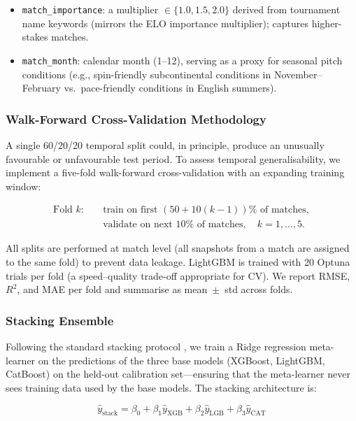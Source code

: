 \documentclass[12pt,a4paper,oneside]{report}
\begin{document}
\begin{itemize}[nosep]
    \item \texttt{match\_importance}: a multiplier $\in \{1.0, 1.5, 2.0\}$ derived from tournament name keywords (mirrors the ELO importance multiplier); captures higher-stakes matches.
    \item \texttt{match\_month}: calendar month (1--12), serving as a proxy for seasonal pitch conditions (e.g., spin-friendly subcontinental conditions in November--February vs.\ pace-friendly conditions in English summers).
\end{itemize}

\subsubsection*{Walk-Forward Cross-Validation Methodology}
\label{sec:walk_forward_cv}

A single 60/20/20 temporal split could, in principle, produce an unusually favourable or unfavourable test period.  To assess temporal generalisability, we implement a five-fold walk-forward cross-validation with an expanding training window:

\begin{align*}
\text{Fold } k: \quad & \text{train on first } (50 + 10(k-1))\% \text{ of matches}, \\
                       & \text{validate on next } 10\% \text{ of matches}, \quad k = 1, \ldots, 5.
\end{align*}

All splits are performed at match level (all snapshots from a match are assigned to the same fold) to prevent data leakage.  LightGBM is trained with 20 Optuna trials per fold (a speed--quality trade-off appropriate for CV).  We report RMSE, $R^2$, and MAE per fold and summarise as mean~$\pm$~std across folds.

\subsubsection*{Stacking Ensemble}
\label{sec:stacking}

Following the standard stacking protocol \citep{Wolpert1992}, we train a Ridge regression meta-learner on the predictions of the three base models (XGBoost, LightGBM, CatBoost) on the held-out calibration set---ensuring that the meta-learner never sees training data used by the base models.  The stacking architecture is:

\begin{equation}
\hat{y}_\text{stack} = \beta_0 + \beta_1 \hat{y}_\text{XGB} + \beta_2 \hat{y}_\text{LGB} + \beta_3 \hat{y}_\text{CAT}
\end{equation}
\end{document}
